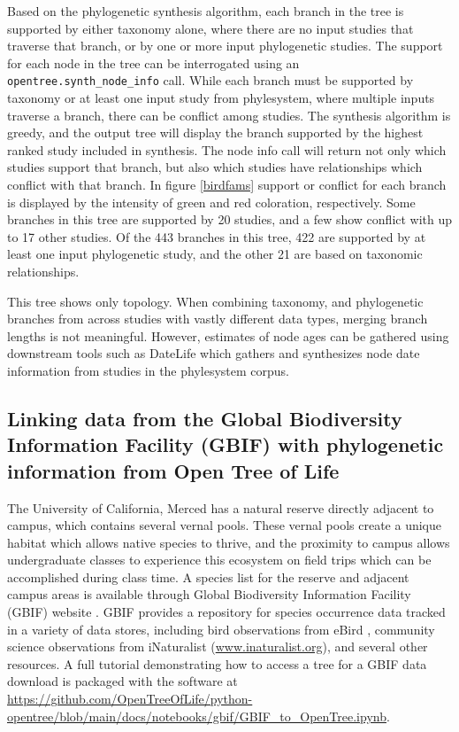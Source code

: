 \documentclass[oupdraft]{sysbio_sse}
\begin{document}
Based on the phylogenetic synthesis algorithm, each branch in the tree is supported by either taxonomy alone, where there are no input studies that traverse that branch, or by one or more input phylogenetic studies. 
The support for each node in the tree can be interrogated using an \texttt{opentree.synth\_node\_info} call.
While each branch must be supported by taxonomy or at least one input study from phylesystem, where multiple inputs traverse a branch, there can be conflict among studies.
The synthesis algorithm is greedy, and the output tree will display the branch supported by the highest ranked study included in synthesis.
The node info call will return not only which studies support that branch, but also which studies have relationships which conflict with that branch.
In figure \ref{birdfams} support or conflict for each branch is displayed by the intensity of green and red coloration, respectively. Some branches in this tree are supported by 20 studies, and a few show conflict with up to 17 other studies. Of the 443 branches in this tree, 422 are supported by at least one input phylogenetic study, and the other 21 are based on taxonomic relationships. 

This tree shows only topology. When combining taxonomy, and phylogenetic branches from across studies with vastly different data types, merging branch lengths is not meaningful. However, estimates of node ages can be gathered using downstream tools such as DateLife \citep{sanchez-reyes_datelife_2019} which gathers and synthesizes node date information from studies  in the phylesystem corpus.

\subsection{Linking data from the Global Biodiversity Information Facility (GBIF) with phylogenetic information from Open Tree of Life}

\bigskip

The University of California, Merced has a natural reserve directly adjacent to campus, which contains several vernal pools. These vernal pools create a unique habitat which allows native species to thrive, and the proximity to campus allows undergraduate classes to experience this ecosystem on field trips which can be accomplished during class time. 
A species list for the reserve and adjacent campus areas is available through Global Biodiversity Information Facility (GBIF) website \citep{gbif_secretariat_gbif_2019}. GBIF provides a repository for species occurrence data tracked in a variety of data stores, including bird observations from eBird \citep{sullivan_ebird_2009}, community science observations from iNaturalist (\url{www.inaturalist.org}), and several other resources. A full tutorial demonstrating how to access a tree for a GBIF data download is packaged with the software at \url{https://github.com/OpenTreeOfLife/python-opentree/blob/main/docs/notebooks/gbif/GBIF_to_OpenTree.ipynb}.
\end{document}
